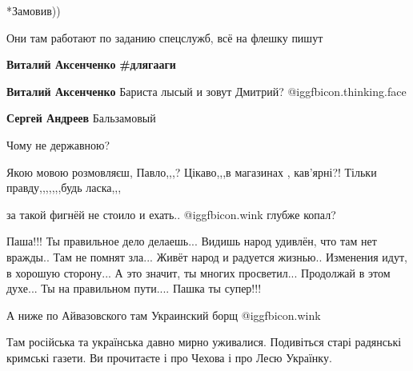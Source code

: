 \begin{itemize}
*Замовив))

Они там работают по заданию спецслужб, всё на флешку пишут

\begin{itemize} %
\textbf{Виталий Аксенченко} \textbf{\#длягааги}

\textbf{Виталий Аксенченко} Бариста лысый и зовут Дмитрий?  @igg{fbicon.thinking.face} 

\textbf{Сергей Андреев} Бальзамовый
\end{itemize} %


Чому не державною?

Якою мовою розмовляєш, Павло,,,? Цікаво,,,в магазинах , кав'ярні?! Тільки правду,,,,,,,будь ласка,,,

за такой фигнёй не стоило и ехать..  @igg{fbicon.wink} 
глубже копал?

Паша!!! Ты правильное дело делаешь...
Видишь народ удивлён, что там нет вражды..
Там не помнят зла... Живёт народ и радуется жизнью..
Изменения идут, в хорошую сторону...
А это значит, ты многих просветил...
Продолжай в этом духе...
Ты на правильном пути....
Пашка ты супер!!!

А ниже по Айвазовского там Украинский борщ  @igg{fbicon.wink} 


Там російська та українська давно мирно уживалися. Подивіться старі радянські
кримські газети. Ви прочитаєте і про Чехова і про Лесю Українку.

\end{itemize} %
